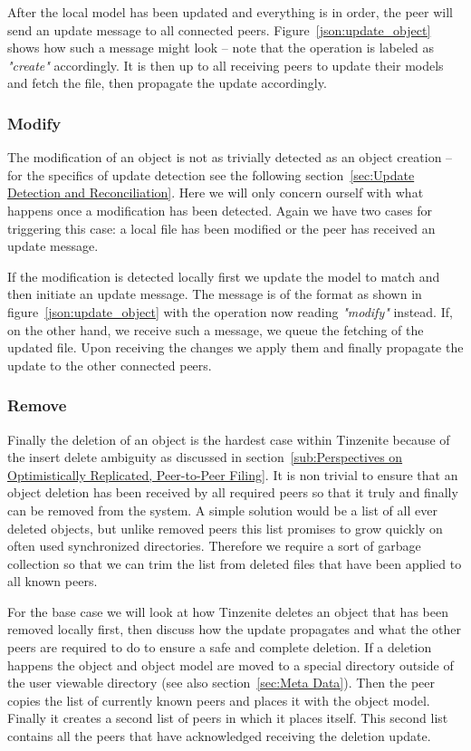 After the local model has been updated and everything is in order, the peer will send an update message to all connected peers.
Figure~\ref{json:update_object} shows how such a message might look – note that the operation is labeled as \textit{"create"} accordingly.
It is then up to all receiving peers to update their models and fetch the file, then propagate the update accordingly.

\subsubsection{Modify}
\label{subs:Modify}

The modification of an object is not as trivially detected as an object creation – for the specifics of update detection see the following section~\ref{sec:Update Detection and Reconciliation}.
Here we will only concern ourself with what happens once a modification has been detected.
Again we have two cases for triggering this case: a local file has been modified or the peer has received an update message.

If the modification is detected locally first we update the model to match and then initiate an update message.
The message is of the format as shown in figure~\ref{json:update_object} with the operation now reading \textit{"modify"} instead.
If, on the other hand, we receive such a message, we queue the fetching of the updated file.
Upon receiving the changes we apply them and finally propagate the update to the other connected peers.

\subsubsection{Remove}
\label{subs:Remove}

Finally the deletion of an object is the hardest case within Tinzenite because of the insert delete ambiguity as discussed in section~\ref{sub:Perspectives on Optimistically Replicated, Peer-to-Peer Filing}.
It is non trivial to ensure that an object deletion has been received by all required peers so that it truly and finally can be removed from the system.
A simple solution would be a list of all ever deleted objects, but unlike removed peers this list promises to grow quickly on often used synchronized directories.
Therefore we require a sort of garbage collection so that we can trim the list from deleted files that have been applied to all known peers.

For the base case we will look at how Tinzenite deletes an object that has been removed locally first, then discuss how the update propagates and what the other peers are required to do to ensure a safe and complete deletion.
If a deletion happens the object and object model are moved to a special directory outside of the user viewable directory (see also section~\ref{sec:Meta Data}).
Then the peer copies the list of currently known peers and places it with the object model.
Finally it creates a second list of peers in which it places itself.
This second list contains all the peers that have acknowledged receiving the deletion update.

